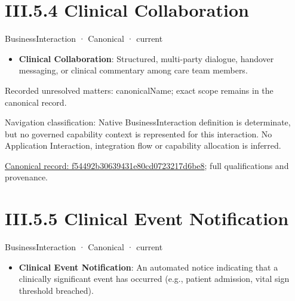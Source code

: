 \section*{III.5.4 Clinical Collaboration}
\label{navigation:III.5.4}

\label{element:f54492b30639431e80cd0723217d6be8}
{\small BusinessInteraction · Canonical · current}\par

\begin{itemize}


\item \textbf{Clinical Collaboration}: Structured, multi-party dialogue, handover messaging, or clinical commentary among care team members.

\end{itemize}

{\small Recorded unresolved matters: canonicalName; exact scope remains in the canonical record.}\par
{\small Navigation classification: Native BusinessInteraction definition is determinate, but no governed capability context is represented for this interaction. No Application Interaction, integration flow or capability allocation is inferred.}\par
{\footnotesize \href{../../../../continuum/business/business-interaction/f54492b30639431e80cd0723217d6be8.md}{Canonical record: f54492b30639431e80cd0723217d6be8}; full qualifications and provenance.}\par
\section*{III.5.5 Clinical Event Notification}
\label{navigation:III.5.5}

\label{element:d2153d1057d740fea1665d71ff66dd1c}
{\small BusinessInteraction · Canonical · current}\par

\begin{itemize}


\item \textbf{Clinical Event Notification}: An automated notice indicating that a clinically significant event has occurred (e.g., patient admission, vital sign threshold breached).

\end{itemize}

